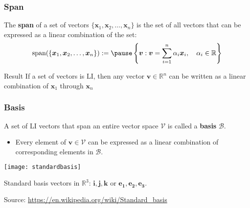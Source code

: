 \documentclass[smaller]{beamer}
\newcommand{\lt}{\left}
\newcommand{\rt}{\right}
\newcommand{\?}{\stackrel{?}{=}}
\newcommand{\mb}{\mathbb}
\newcommand{\mc}{\mathcal}
\begin{document}
\begin{frame}
	\frametitle{Span}
	\pause
	The \textbf{span} of a set of vectors $\{\bm x_1, \bm x_2, \ldots, \bm x_n\}$
	is the set of all vectors that can be expressed as a linear
	combination of the set: \pause
	\begin{equation}
		\text{span}( \{\bm x_1, \bm x_2, \ldots, \bm x_n\}) := \pause
		\lt\{ \bm v : \bm v = \sum_{i=1}^n \alpha_i\bm x_i,\quad \alpha_i
		\in \mb{R}\rt\}
	\end{equation}
	
	\pause
	\begin{alertblock}{Result}
		If a set of vectors is LI, then any vector $\bm v \in \mb{R}^n$
		can be written as a linear combination of $\bm x_1$ through
		$\bm x_n$
	\end{alertblock}
	\pause
	
\end{frame}

\begin{frame}
	\frametitle{Basis}
	A set of LI vectors that span an entire vector space $\mc{V}$ is
	called a \textbf{basis} $\mc{B}$.
	\pause
	\begin{itemize}
		\item Every element of $\bm v\in \mc{V}$ can be expressed as a
		linear combination of corresponding elements in $\mc{B}$.
	\end{itemize}
	\pause
	\begin{center}
		\texttt{[image: standardbasis]}
		
		{\footnotesize Standard basis vectors in $\mb{R}^3$: $\bm{i, j, k}$ or
			$\bm{e_1, e_2, e_3}$. 
			
			Source: \url{https://en.wikipedia.org/wiki/Standard_basis}}
		
	\end{center}
\end{frame}
\end{document}
